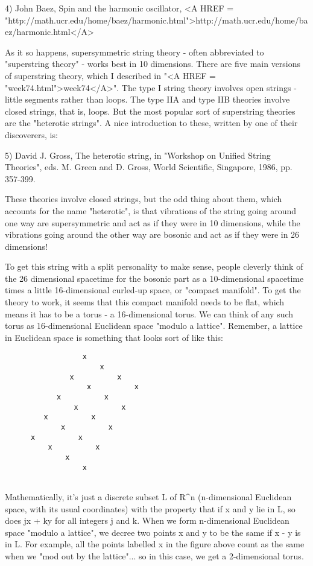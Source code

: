 4) John Baez, Spin and the harmonic oscillator, 
<A HREF = "http://math.ucr.edu/home/baez/harmonic.html">http://math.ucr.edu/home/baez/harmonic.html</A>

As it so happens, supersymmetric string theory - often abbreviated
to "superstring theory" - works best in 10 dimensions.  There are 
five main versions of superstring theory, which I described in 
"<A HREF = "week74.html">week74</A>".  The type I string theory involves open strings - little
segments rather than loops.  The type IIA and type IIB theories
involve closed strings, that is, loops.   But the most popular sort
of superstring theories are the "heterotic strings".  A nice 
introduction to these, written by one of their discoverers, is:

5) David J. Gross, The heterotic string, in "Workshop on Unified 
String Theories", eds. M. Green and D. Gross, World Scientific, 
Singapore, 1986, pp. 357-399.  

These theories involve closed strings, but the odd thing about 
them, which accounts for the name "heterotic", is that vibrations 
of the string going around one way are supersymmetric and act as 
if they were in 10 dimensions, while the vibrations going around
the other way are bosonic and act as if they were in 26 dimensions!

To get this string with a split personality to make sense, people 
cleverly think of the 26 dimensional spacetime for the bosonic part 
as a 10-dimensional spacetime times a little 16-dimensional curled-up 
space, or "compact manifold".  To get the theory to work, it seems that
this compact manifold needs to be flat, which means it has to be a 
torus - a 16-dimensional torus.  We can think of any such torus as
16-dimensional Euclidean space "modulo a lattice".  Remember, a lattice
in Euclidean space is something that looks sort of like this:

\begin{verbatim}
                  x
                      x
               x          x
                   x          x 
            x          x
                x          x
         x          x
             x          x
      x          x   
          x          x
              x 
                  x


\end{verbatim}
    
Mathematically, it's just a discrete subset L of R^{n} (n-dimensional
Euclidean space, with its usual coordinates) with the property that 
if x and y lie in L, so does jx + ky for all integers j and k.  When 
we form n-dimensional Euclidean space "modulo a lattice", we decree 
two points x and y to be the same if x - y is in L.   For example, 
all the points labelled x in the figure above count as the same 
when we "mod out by the lattice"... so in this case, we get a 
2-dimensional torus.  

